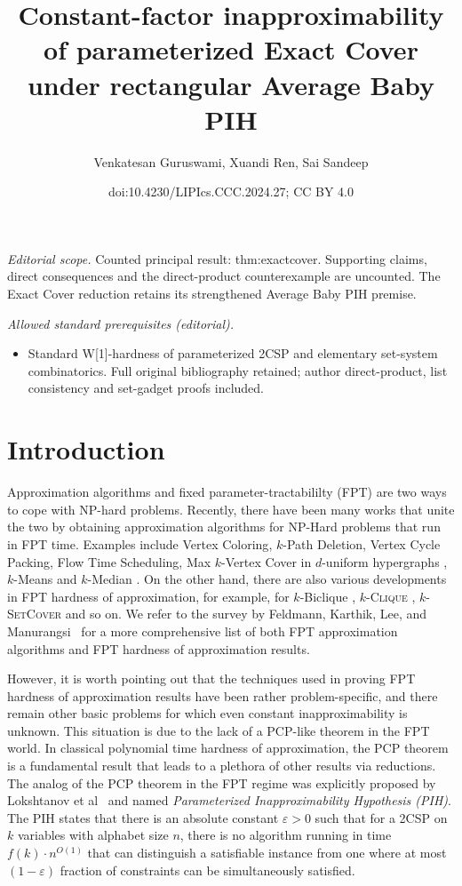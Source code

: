 \documentclass[10pt,a4paper]{article}
\title{Constant-factor inapproximability of parameterized Exact Cover under rectangular Average Baby PIH}
\author{Venkatesan Guruswami, Xuandi Ren, Sai Sandeep}
\date{doi:10.4230/LIPIcs.CCC.2024.27; CC BY 4.0}
\newcommand{\kclique}{\textsc{$k$-Clique}}
\newcommand{\ksetcover}{\textsc{$k$-SetCover}}
\begin{document}
\maketitle
\noindent\textit{Editorial scope.} Counted principal result: thm:exactcover. Supporting claims, direct consequences and the direct-product counterexample are uncounted. The Exact Cover reduction retains its strengthened Average Baby PIH premise.\par\medskip
\noindent\textit{Allowed standard prerequisites (editorial).}\begin{itemize}
\item Standard W[1]-hardness of parameterized 2CSP and elementary set-system combinatorics. Full original bibliography retained; author direct-product, list consistency and set-gadget proofs included.
\end{itemize}\medskip
\section{Introduction}

\noindent Approximation algorithms and fixed parameter-tractabililty (FPT) are two ways to cope with NP-hard problems. Recently, there have been many works that unite the two by obtaining approximation algorithms for NP-Hard problems that run in FPT time. Examples include {\sc Vertex Coloring}\cite{DHK05,Mar08}, {\sc $k$-Path Deletion}\cite{Lee19}, {\sc Vertex Cycle Packing}\cite{Lok+17}, {\sc Flow Time Scheduling}\cite{Wie18}, {\sc Max $k$-Vertex Cover} in $d$-uniform hypergraphs \cite{SF17,Man19}, {\sc $k$-Means} and {\sc $k$-Median} \cite{LiS16,BPR+17,KMN+04,ANSW20,CGTS02,CGK+19}. 
On the other hand, there are also various developments in FPT hardness of approximation, for example, for {\sc $k$-Biclique} \cite{Lin18}, \kclique{} \cite{CCK+17, Lin21, LRSW22, KK22, LRSW23, CFL+23}, \ksetcover{} \cite{CCK+17,CL19,KLM19,Lin19,KN21,LRSW23a} and so on.
We refer to the survey by Feldmann, Karthik, Lee, and Manurangsi~\cite{FKLM20} for a more comprehensive list of both FPT approximation algorithms and FPT hardness of approximation results.

However, it is worth pointing out that the techniques used in proving FPT hardness of approximation results have been rather problem-specific, and there remain other basic problems for which even constant inapproximability is unknown. This situation is due to the lack of a PCP-like theorem in the FPT world. In classical polynomial time hardness of approximation, the PCP theorem is a fundamental result that leads to a plethora of other results via reductions. The analog of the PCP theorem in the FPT regime was explicitly proposed by Lokshtanov et al~\cite{LRSZ20} and named \emph{Parameterized Inapproximability Hypothesis (PIH)}. The PIH states that there is an absolute constant $\varepsilon > 0$ such that for a 2CSP on $k$ variables with alphabet size $n$, there is no algorithm running in time $f(k)\cdot n^{O(1)}$ that can distinguish a satisfiable instance from one where at most $(1-\varepsilon)$ fraction of constraints can be simultaneously satisfied.
\end{document}
